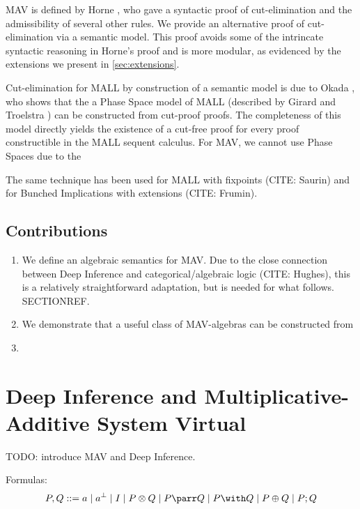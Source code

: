 \documentclass[twoside,11pt]{entics}
\begin{document}
MAV is defined by Horne \cite{Horne15:mav}, who gave a syntactic proof
of cut-elimination and the admissibility of several other rules. We
provide an alternative proof of cut-elimination via a semantic
model. This proof avoids some of the intrincate syntactic reasoning in
Horne's proof and is more modular, as evidenced by the extensions we
present in \autoref{sec:extensions}.

Cut-elimination for MALL by construction of a semantic model is due to
Okada \cite{Okada99:psc}, who shows that the a Phase Space model of
MALL (described by Girard \cite{Girard87:ll} and Troelstra
\cite{TroelstraXX:lnll}) can be constructed from cut-proof proofs. The
completeness of this model directly yields the existence of a cut-free
proof for every proof constructible in the MALL sequent calculus. For
MAV, we cannot use Phase Spaces due to the 

The same technique has been used for MALL with fixpoints (CITE:
Saurin) and for Bunched Implications with extensions (CITE: Frumin).


\subsection{Contributions}

\begin{enumerate}
\item We define an algebraic semantics for MAV. Due to the close
  connection between Deep Inference and categorical/algebraic logic
  (CITE: Hughes), this is a relatively straightforward adaptation, but
  is needed for what follows. SECTIONREF.
\item We demonstrate that a useful class of MAV-algebras can be
  constructed from 
\item 
\end{enumerate}

\section{Deep Inference and Multiplicative-Additive System Virtual}

TODO: introduce MAV and Deep Inference.

Formulas:
\begin{displaymath}
  P, Q ::= a \mid a^\perp \mid I \mid P \otimes Q \mid P \parr Q \mid P \with Q \mid P \oplus Q \mid P; Q
\end{displaymath}
\end{document}
